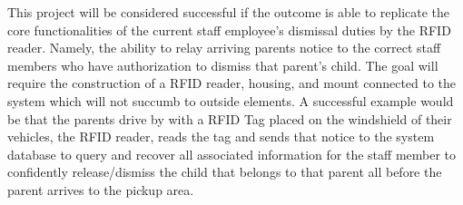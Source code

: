 \quad \quad This project will be considered successful if the outcome is able to replicate the core functionalities of the current staff employee's dismissal duties by the RFID reader. 
Namely, the ability to relay arriving parents notice to the correct staff members who have authorization to dismiss that parent's child. 
The goal will require the construction of a RFID reader, housing, and mount connected to the system which will not succumb to outside elements. 
A successful example would be that the parents drive by with a RFID Tag placed on the windshield of their vehicles, the RFID reader, reads the tag and sends that notice to the system database to query and recover all associated information for the staff member to confidently release/dismiss the child that belongs to that parent all before the parent arrives to the pickup area.
